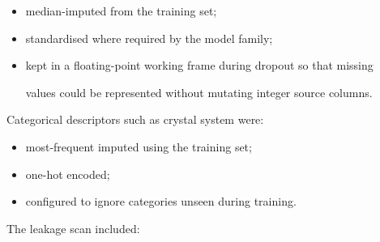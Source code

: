 \documentclass[11pt,a4paper,oneside]{report}
\begin{document}
\begin{itemize}



\item

median-imputed from the training set;



\item

standardised where required by the model family;



\item

kept in a floating-point working frame during dropout so that missing

values could be represented without mutating integer source columns.



\end{itemize}



Categorical descriptors such as crystal system were:



\begin{itemize}



\item

most-frequent imputed using the training set;



\item

one-hot encoded;



\item

configured to ignore categories unseen during training.



\end{itemize}



The leakage scan included:
\end{document}
